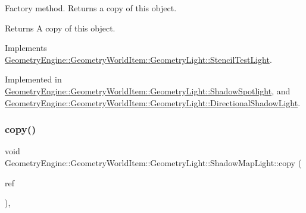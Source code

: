 Factory method. Returns a copy of this object. \begin{DoxyReturn}{Returns}
A copy of this object. 
\end{DoxyReturn}


Implements \mbox{\hyperlink{class_geometry_engine_1_1_geometry_world_item_1_1_geometry_light_1_1_stencil_test_light_a6434a228dc64537ff9984c82eaf8ab07}{Geometry\+Engine\+::\+Geometry\+World\+Item\+::\+Geometry\+Light\+::\+Stencil\+Test\+Light}}.



Implemented in \mbox{\hyperlink{class_geometry_engine_1_1_geometry_world_item_1_1_geometry_light_1_1_shadow_spotlight_a0ea8fd05d26f6e780d352168c28f940d}{Geometry\+Engine\+::\+Geometry\+World\+Item\+::\+Geometry\+Light\+::\+Shadow\+Spotlight}}, and \mbox{\hyperlink{class_geometry_engine_1_1_geometry_world_item_1_1_geometry_light_1_1_directional_shadow_light_ae5016cad41a62c4c870a942acc3f9afe}{Geometry\+Engine\+::\+Geometry\+World\+Item\+::\+Geometry\+Light\+::\+Directional\+Shadow\+Light}}.

\mbox{\label{class_geometry_engine_1_1_geometry_world_item_1_1_geometry_light_1_1_shadow_map_light_a778fdb3b00c8b930e03ebbde77c9433c}} 
\subsubsection{\texorpdfstring{copy()}{copy()}}
{\footnotesize\ttfamily void Geometry\+Engine\+::\+Geometry\+World\+Item\+::\+Geometry\+Light\+::\+Shadow\+Map\+Light\+::copy (\begin{DoxyParamCaption}\item[{const \mbox{\hyperlink{class_geometry_engine_1_1_geometry_world_item_1_1_geometry_light_1_1_shadow_map_light}{Shadow\+Map\+Light}} \&}]{ref }\end{DoxyParamCaption})\hspace{0.3cm}{\ttfamily [protected]}, {\ttfamily [virtual]}}

